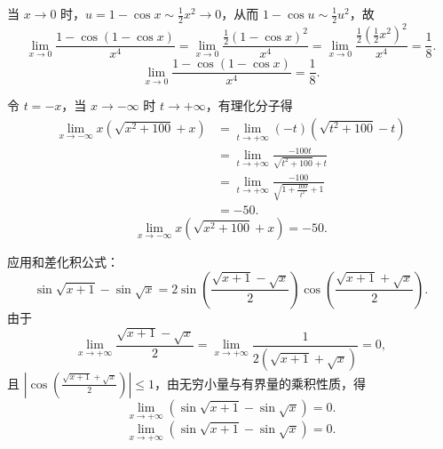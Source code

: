 \begin{solution}

    当 $x \to 0$ 时，$u = 1 - \cos x \sim \frac{1}{2}x^2 \to 0$，从而 $1 - \cos u \sim \frac{1}{2}u^2$，故
    \begin{equation}
        \lim_{x\to 0} \frac{1-\cos(1-\cos x)}{x^4} = \lim_{x\to 0} \frac{\frac{1}{2}(1 - \cos x)^2}{x^4} = \lim_{x\to 0} \frac{\frac{1}{2}\left(\frac{1}{2}x^2\right)^2}{x^4} = \frac{1}{8}.
    \end{equation}
    \begin{equation}
        \boxed{\lim_{x\to 0} \frac{1-\cos(1-\cos x)}{x^4} = \frac{1}{8}.}
    \end{equation}


    令 $t = -x$，当 $x \to -\infty$ 时 $t \to +\infty$，有理化分子得
    \begin{equation}
        \begin{aligned}
            \lim_{x\to -\infty} x(\sqrt{x^2+100}+x) & = \lim_{t\to +\infty} (-t)(\sqrt{t^2+100}-t)                  \\
                                                    & = \lim_{t\to +\infty} \frac{-100t}{\sqrt{t^2+100}+t}          \\
                                                    & = \lim_{t\to +\infty} \frac{-100}{\sqrt{1+\frac{100}{t^2}}+1} \\
                                                    & = -50.
        \end{aligned}
    \end{equation}
    \begin{equation}
        \boxed{\lim_{x\to -\infty} x(\sqrt{x^2+100}+x) = -50.}
    \end{equation}


    应用和差化积公式：
    \begin{equation}
        \sin\sqrt{x+1}-\sin\sqrt{x} = 2 \sin\left( \frac{\sqrt{x+1}-\sqrt{x}}{2} \right) \cos\left( \frac{\sqrt{x+1}+\sqrt{x}}{2} \right).
    \end{equation}
    由于
    \begin{equation}
        \lim_{x\to +\infty} \frac{\sqrt{x+1}-\sqrt{x}}{2} = \lim_{x\to +\infty} \frac{1}{2(\sqrt{x+1}+\sqrt{x})} = 0,
    \end{equation}
    且 $\left| \cos\left( \frac{\sqrt{x+1}+\sqrt{x}}{2} \right) \right| \leqslant 1$，由无穷小量与有界量的乘积性质，得
    \begin{equation}
        \lim_{x\to +\infty} (\sin\sqrt{x+1}-\sin\sqrt{x}) = 0.
    \end{equation}
    \begin{equation}
        \boxed{\lim_{x\to +\infty} (\sin\sqrt{x+1}-\sin\sqrt{x}) = 0.}
    \end{equation}


\end{solution}
